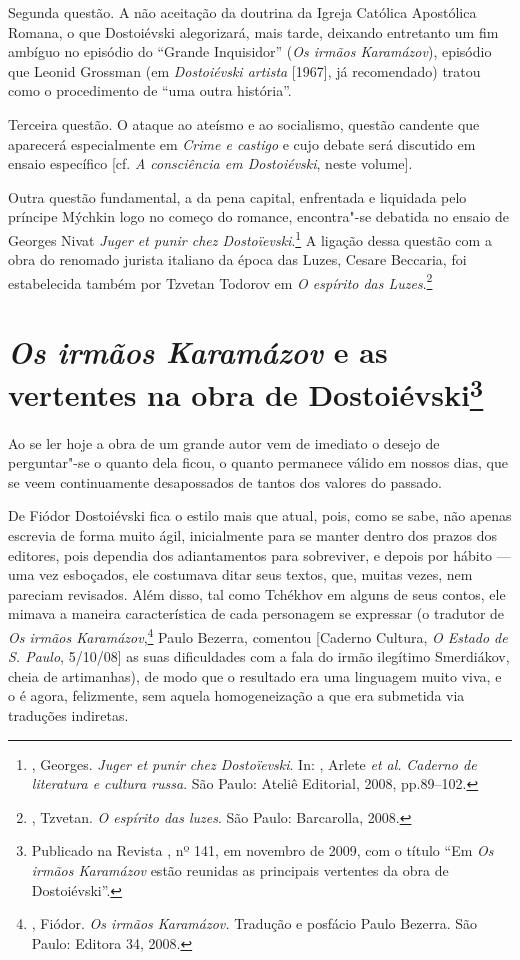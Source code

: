 Segunda questão. A não aceitação da doutrina da Igreja Católica
Apostólica Romana, o que Dostoiévski alegorizará, mais tarde,
deixando entretanto um fim ambíguo no episódio do ``Grande
Inquisidor'' (\emph{Os irmãos Karamázov}), episódio que
Leonid Grossman (em \emph{Dostoiévski artista} [1967],
já recomendado) tratou como o procedimento de ``uma outra
história''.

Terceira questão. O ataque ao ateísmo e ao socialismo, questão
candente que aparecerá especialmente em \emph{Crime e castigo}
e cujo debate será discutido em ensaio específico [cf.
\emph{A consciência em Dostoiévski}, neste volume].

Outra questão fundamental, a da pena capital, enfrentada e
liquidada pelo príncipe Mýchkin logo no começo do romance,
encontra"-se debatida no ensaio de Georges Nivat \emph{Juger
et punir chez Dostoïevski}.\footnote{, Georges.
\emph{Juger et punir chez Dostoïevski}. In: ,
Arlete \emph{et al.} \emph{Caderno de literatura e cultura
russa}. São Paulo: Ateliê Editorial, 2008, pp.89--102.} A
ligação dessa questão com a obra do renomado jurista italiano
da época das Luzes, Cesare Beccaria, foi estabelecida também
por Tzvetan Todorov em \emph{O espírito das
Luzes}.\footnote{, Tzvetan. \emph{O espírito
das luzes}. São Paulo: Barcarolla, 2008.}

\chapter{\emph{Os irmãos Karamázov} e as vertentes na obra de
Dostoiévski\footnote{Publicado na Revista \protect{}, nº 141, em novembro de 2009,
com o título ``Em \emph{Os irmãos Karamázov} estão reunidas as
principais vertentes da obra de Dostoiévski''.}}
\label{irmaoskaramazov}

Ao se ler hoje a obra de um grande autor vem de imediato o
desejo de perguntar"-se o quanto dela ficou, o quanto permanece
válido em nossos dias, que se veem continuamente desapossados de
tantos dos valores do passado.

De Fiódor Dostoiévski fica o estilo mais que atual, pois, como se sabe,
não apenas escrevia de forma muito ágil, inicialmente para se manter
dentro dos prazos dos editores, pois dependia dos adiantamentos para
sobreviver, e depois por hábito --- uma vez esboçados, ele costumava
ditar seus textos, que, muitas vezes, nem pareciam revisados. Além
disso, tal como Tchékhov em alguns de seus contos, ele mimava a maneira
característica de cada personagem se expressar (o tradutor de \emph{Os
irmãos Karamázov},\footnote{, Fiódor. \emph{Os irmãos
  Karamázov.} Tradução e posfácio Paulo Bezerra. São Paulo: Editora 34,
  2008.} Paulo Bezerra, comentou [Caderno Cultura, \emph{O Estado de S.
Paulo}, 5/10/08] as suas dificuldades com a fala do irmão ilegítimo
Smerdiákov, cheia de artimanhas), de modo que o resultado era uma
linguagem muito viva, e o é agora, felizmente, sem aquela homogeneização
a que era submetida via traduções indiretas.


